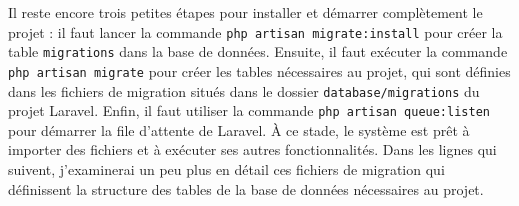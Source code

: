 Il reste encore trois petites étapes pour installer et démarrer complètement le projet : il faut lancer la commande \Verb|php artisan migrate:install| pour créer la table \Verb|migrations| dans la base de données. Ensuite, il faut exécuter la commande \Verb|php artisan migrate| pour créer les tables nécessaires au projet, qui sont définies dans les fichiers de migration situés dans le dossier \Verb|database/migrations| du projet Laravel. Enfin, il faut utiliser la commande \Verb|php artisan queue:listen| pour démarrer la file d'attente de Laravel. À ce stade, le système est prêt à importer des fichiers et à exécuter ses autres fonctionnalités. Dans les lignes qui suivent, j'examinerai un peu plus en détail ces fichiers de migration qui définissent la structure des tables de la base de données nécessaires au projet.